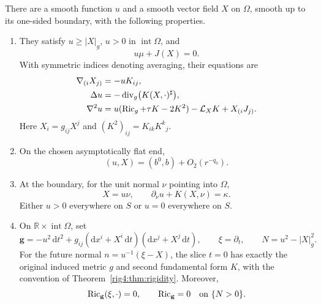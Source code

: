 \begin{theorem}
\label{rig4:adj:causal-field}
There are a smooth function $u$ and a smooth vector field $X$ on $\Omega$,
smooth up to its one-sided boundary, with the following properties.
\begin{enumerate}[label=\textup{(\roman*)}]
\item They satisfy $u\ge |X|_g$, $u>0$ in $\operatorname{int}\Omega$, and
\begin{equation}
 u\mu+J(X)=0.
 \label{rig4:adj:complementarity}
\end{equation}
With symmetric indices denoting averaging, their equations are
\begin{align}
 \nabla_{(i}X_{j)}&=-uK_{ij},
 \label{rig4:adj:kid-first}\\
 \Delta u&=-\operatorname{div}_g\bigl(K(X,\cdot)^\sharp\bigr),
 \label{rig4:adj:conformal-adjoint}\\
 \nabla^2u
 &=u(\operatorname{Ric}_g+\tau K-2K^2)-\mathcal L_XK+X_{(i}J_{j)}.
 \label{rig4:adj:kid-second}
\end{align}
Here $X_i=g_{ij}X^j$ and $(K^2)_{ij}=K_{ik}K^k{}_j$.
\item On the chosen asymptotically flat end,
\begin{equation}
 (u,X)=(b^0,b)+O_2(r^{-q_0}).
 \label{rig4:adj:decay}
\end{equation}
\item At the boundary, for the unit normal $\nu$ pointing into $\Omega$,
\begin{equation}
 X=u\nu,\qquad
 \partial_\nu u+K(X,\nu)=\kappa.
 \label{rig4:adj:horizon-data}
\end{equation}
Either $u>0$ everywhere on $S$ or $u=0$ everywhere on $S$.
\item On $\mathbb R\times\operatorname{int}\Omega$, set
\begin{equation}
 \mathbf g=-u^2\,\mathrm dt^2
   +g_{ij}(\mathrm dx^i+X^i\,\mathrm dt)
          (\mathrm dx^j+X^j\,\mathrm dt),
 \qquad \xi=\partial_t,\qquad N=u^2-|X|_g^2.
 \label{rig4:adj:stationary-metric}
\end{equation}
For the future normal $n=u^{-1}(\xi-X)$, the slice $t=0$ has exactly the
original induced metric $g$ and second fundamental form $K$, with the convention
of Theorem~\ref{rig4:thm:rigidity}.  Moreover,
\begin{equation}
 \operatorname{Ric}_{\mathbf g}(\xi,\cdot)=0,
 \qquad \operatorname{Ric}_{\mathbf g}=0\quad\hbox{on }\{N>0\}.
 \label{rig4:adj:ricci}
\end{equation}

\end{enumerate}
\end{theorem}
